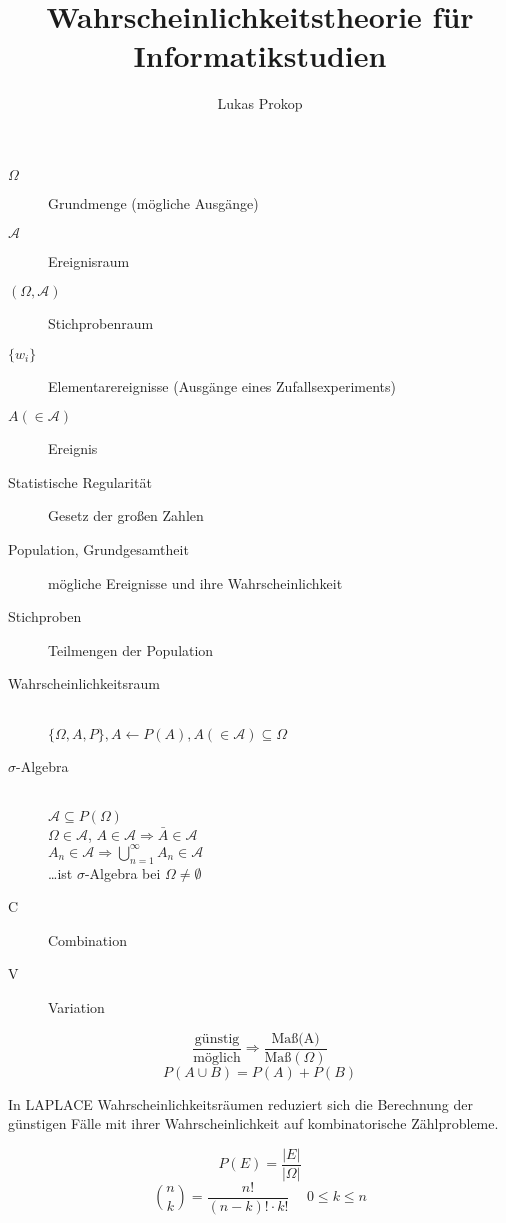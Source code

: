\documentclass[a4paper,twocolumn]{article}
\author{Lukas Prokop}
\title{Wahrscheinlichkeitstheorie für Informatikstudien}
\begin{document}
\maketitle

\begin{description}
  \item[$\Omega$] Grundmenge (mögliche Ausgänge)
  \item[$\mathcal{A}$] Ereignisraum
  \item[$(\Omega, \mathcal{A})$] Stichprobenraum
  \item[$\{w_i\}$] Elementarereignisse
    (Ausgänge eines Zufallsexperiments)
  \item[$A (\in \mathcal{A})$] Ereignis
  \item[Statistische Regularität] Gesetz der großen Zahlen
  \item[Population, Grundgesamtheit]
    mögliche Ereignisse und ihre Wahrscheinlichkeit
  \item[Stichproben] Teilmengen der Population
  \item[Wahrscheinlichkeitsraum] \hfill{} \\
    $\{\Omega, A, P\}, A \leftarrow P(A),
        A (\in \mathcal{A}) \subseteq \Omega$
  \item[$\sigma$-Algebra] \hfill{} \\
    $\mathcal{A} \subseteq P(\Omega)$ \\
    $\Omega \in \mathcal{A}$, $A \in \mathcal{A} \Rightarrow \bar{A} \in
    \mathcal{A}$ \\
    $A_n \in \mathcal{A} \Rightarrow \bigcup_{n=1}^\infty A_n \in
    \mathcal{A}$ \\
    \dots ist $\sigma$-Algebra bei $\Omega \neq \emptyset$
  \item[C] Combination
  \item[V] Variation
\end{description}

\[
    \frac{\mbox{günstig}}{\mbox{möglich}} \Rightarrow
        \frac{\mbox{Maß(A)}}{\mbox{Maß}(\Omega)}
\] \[
    P(A\cup B) = P(A) + P(B)
\]

In LAPLACE Wahrscheinlichkeitsräumen reduziert sich die Berechnung der
günstigen Fälle mit ihrer Wahrscheinlichkeit auf kombinatorische
Zählprobleme.

\[
    P(E) = \frac{| E |}{| \Omega |}
\] \[
    {n \choose k} = \frac{n!}{(n-k)!\cdot k!}
        \hspace{15pt} 0 \leq k \leq n
\]
\end{document}
